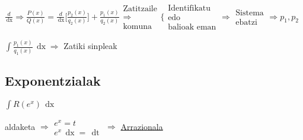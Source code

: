 \documentclass[8pt]{article}
\DeclareMathOperator{\xder}{\, \mathrm{d}x}
\DeclareMathOperator{\tder}{\, \mathrm{d}t}
\begin{document}
			$ \frac{d}{\xder} \Rightarrow \frac{P(x)}{Q(x)} = \frac{d}{\xder} 
				\Big[ \frac{p_2 (x)}{q_2 (x)} \Big] + \frac{p_1 (x)}{q_2 (x)}
				\begin{array}{c}
					\text{Zatitzaile}\\
					\Rightarrow\\
					\text{komuna}
				\end{array}
				\Bigg \{
				\begin{array}{c}
					\text{Identifikatu}\\
					\text{edo}\\
					\text{balioak eman}
				\end{array}
				\Rightarrow
				\begin{array}{c}
					\text{Sistema}\\
					\text{ebatzi}
				\end{array} \Rightarrow p_1 , p_2 $

				$ \int \frac{p_1 (x)}{q_1 (x)} \xder \Rightarrow $ Zatiki sinpleak

	\subsection{Exponentzialak}
		$ \int R (e^x) \xder $

			aldaketa $ \Rightarrow
			\begin{array}{c}
				e^x = t\\
				e^x \xder = \tder
			\end{array}
			\Rightarrow $ \underline{Arrazionala}
\end{document}
